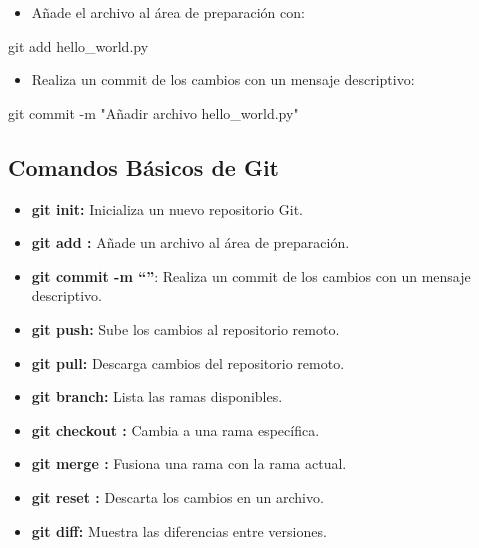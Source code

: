 \documentclass[
  a4paper,
  DIV=11,
  numbers=noendperiod,
  onepage,
  openany]{scrreprt}
\newenvironment{Shaded}{\begin{snugshade}}{\end{snugshade}}
\newcommand{\AttributeTok}[1]{\textcolor[rgb]{0.40,0.45,0.13}{#1}}
\newcommand{\FunctionTok}[1]{\textcolor[rgb]{0.28,0.35,0.67}{#1}}
\newcommand{\NormalTok}[1]{\textcolor[rgb]{0.00,0.23,0.31}{#1}}
\newcommand{\StringTok}[1]{\textcolor[rgb]{0.13,0.47,0.30}{#1}}
\providecommand{\tightlist}{%
  \setlength{\itemsep}{0pt}\setlength{\parskip}{0pt}}\usepackage{longtable,booktabs,array}
\begin{document}
\begin{itemize}
\tightlist
\item
  Añade el archivo al área de preparación con:
\end{itemize}

\begin{Shaded}
\begin{Highlighting}[]
\FunctionTok{git}\NormalTok{ add hello\_world.py}
\end{Highlighting}
\end{Shaded}

\begin{itemize}
\tightlist
\item
  Realiza un commit de los cambios con un mensaje descriptivo:
\end{itemize}

\begin{Shaded}
\begin{Highlighting}[]
\FunctionTok{git}\NormalTok{ commit }\AttributeTok{{-}m} \StringTok{"Añadir archivo hello\_world.py"}
\end{Highlighting}
\end{Shaded}

\subsection{Comandos Básicos de Git
📝}\label{comandos-buxe1sicos-de-git}

\begin{itemize}
\tightlist
\item
  \textbf{git init:} Inicializa un nuevo repositorio Git.
\item
  \textbf{git add :} Añade un archivo al área de preparación.
\item
  \textbf{git commit -m ``''}: Realiza un commit de los cambios con un
  mensaje descriptivo.
\item
  \textbf{git push:} Sube los cambios al repositorio remoto.
\item
  \textbf{git pull:} Descarga cambios del repositorio remoto.
\item
  \textbf{git branch:} Lista las ramas disponibles.
\item
  \textbf{git checkout :} Cambia a una rama específica.
\item
  \textbf{git merge :} Fusiona una rama con la rama actual.
\item
  \textbf{git reset :} Descarta los cambios en un archivo.
\item
  \textbf{git diff:} Muestra las diferencias entre versiones.
\end{itemize}
\end{document}
